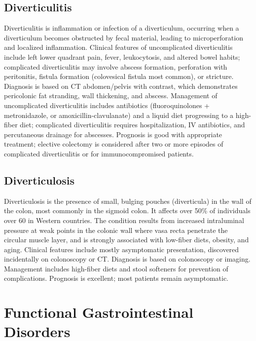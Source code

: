 \subsection{Diverticulitis}
\label{sec:Diverticulitis}
Diverticulitis is inflammation or infection of a diverticulum, occurring when a diverticulum becomes obstructed by fecal material, leading to microperforation and localized inflammation. Clinical features of uncomplicated diverticulitis include left lower quadrant pain, fever, leukocytosis, and altered bowel habits; complicated diverticulitis may involve abscess formation, perforation with peritonitis, fistula formation (colovesical fistula most common), or stricture. Diagnosis is based on CT abdomen/pelvis with contrast, which demonstrates pericolonic fat stranding, wall thickening, and abscess. Management of uncomplicated diverticulitis includes antibiotics (fluoroquinolones + metronidazole, or amoxicillin-clavulanate) and a liquid diet progressing to a high-fiber diet; complicated diverticulitis requires hospitalization, IV antibiotics, and percutaneous drainage for abscesses. Prognosis is good with appropriate treatment; elective colectomy is considered after two or more episodes of complicated diverticulitis or for immunocompromised patients.

\subsection{Diverticulosis}
\label{sec:Diverticulosis}
Diverticulosis is the presence of small, bulging pouches (diverticula) in the wall of the colon, most commonly in the sigmoid colon. It affects over 50\% of individuals over 60 in Western countries. The condition results from increased intraluminal pressure at weak points in the colonic wall where vasa recta penetrate the circular muscle layer, and is strongly associated with low-fiber diets, obesity, and aging. Clinical features include mostly asymptomatic presentation, discovered incidentally on colonoscopy or CT. Diagnosis is based on colonoscopy or imaging. Management includes high-fiber diets and stool softeners for prevention of complications. Prognosis is excellent; most patients remain asymptomatic.

\section{Functional Gastrointestinal Disorders}

